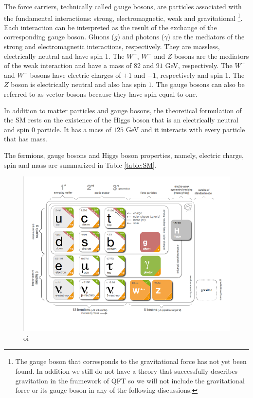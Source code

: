 The force carriers, technically called gauge bosons, are particles associated with the fundamental interactions: strong, electromagnetic, weak and gravitational \footnote{The gauge boson that corresponds to the gravitational force has not yet been found. In addition we still do not have a theory that successfully describes gravitation in the framework of QFT so we will not include the gravitational force or its gauge boson in any of the following discussions.}. Each interaction can be interpreted as the result of the exchange of the corresponding gauge boson. Gluons ($g$) and photons ($\gamma$) are the mediators of the strong and electromagnetic interactions, respectively. They are massless, electrically neutral and have spin $1$. The $W^+$, $W^-$ and $Z$ bosons are the mediators of the weak interaction and have a mass of $82$ and $91$ GeV, respectively. The $W^+$ and $W^-$ bosons have electric charges of $+1$ and $-1$, respectively and spin $1$. The $Z$ boson is electrically neutral and also has spin $1$. The gauge bosons can also be referred to as vector bosons because they have spin equal to one.

In addition to matter particles and gauge bosons, the theoretical formulation of the SM rests on the existence of the Higgs boson that is an electrically neutral and spin $0$ particle. It has a mass of $125$ GeV and it interacts with every particle that has mass.

The fermions, gauge bosons and Higgs boson properties, namely, electric charge, spin and mass are summarized in Table \ref{table:SM}.

\begin{figure}[]
	\centering
	\includegraphics[trim={.5cm 1.5cm 0.5cm 0},clip,width=.8\textwidth]{./Figures/SM_CERN.png}
	\caption{oi}
	\label{fig:sm_particles}
\end{figure}

